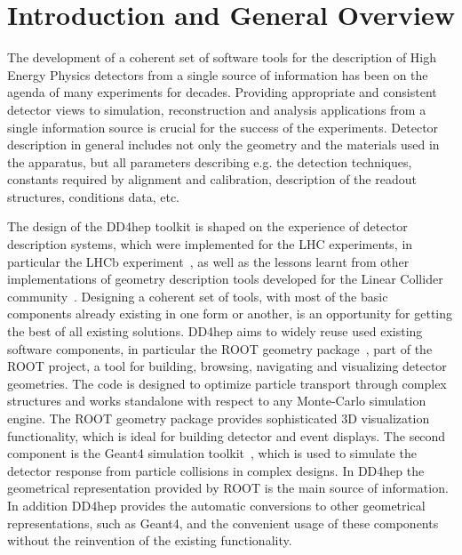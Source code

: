 \section{Introduction and General Overview}
\label{sec:introduction}
\noindent
The development of a coherent set of software tools for the description of 
High Energy Physics detectors from a single source of information has been
on the agenda of many experiments for decades.
Providing appropriate and consistent detector views to simulation, 
reconstruction and analysis applications from a single information source
is crucial for the success of the experiments.
Detector description in general includes not only the geometry and the 
materials used in the apparatus, but all parameters describing e.g. the 
detection techniques, constants required by alignment and calibration, 
description of the readout structures, conditions data, etc. 

\noindent
The design of the DD4hep toolkit\cite{bib:DD4hep} 
is shaped on the experience of detector description 
systems, which were implemented for the LHC experiments, in particular 
the LHCb experiment~\cite{bib:LHCb,bib:LHCb-geometry}, 
as well as the lessons learnt from other
implementations of geometry description tools developed for 
the Linear Collider community~\cite{bib:ILD,bib:SiD}. 
Designing a coherent set of tools, with most of the basic components 
already existing in one form or another, is an opportunity for getting 
the best of all existing solutions. 
DD4hep aims to widely reuse used existing software components, in particular
the ROOT geometry package~\cite{bib:ROOT-tgeo}, part of the 
ROOT project\cite{bib:ROOT}, a tool for 
building, browsing, navigating and visualizing detector geometries. The
code is designed to optimize particle transport through complex 
structures and works standalone with respect to any Monte-Carlo 
simulation engine. The ROOT geometry package provides
sophisticated 3D visualization functionality, which is ideal for building 
detector and event displays. The second component is 
the Geant4 simulation toolkit~\cite{bib:geant4}, which is used to 
simulate the detector response from particle collisions in complex designs.
In DD4hep the geometrical
representation provided by ROOT is the main source of information.
In addition DD4hep provides the automatic conversions to other geometrical 
representations, such as Geant4, and the convenient usage of these 
components without the reinvention of the existing functionality.

